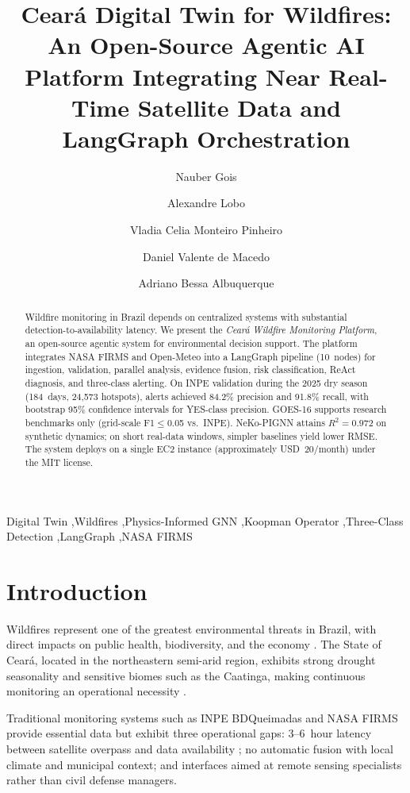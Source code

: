 \documentclass[preprint,12pt,times,numbers]{elsarticle}
\title{Ceará Digital Twin for Wildfires: An Open-Source Agentic AI Platform Integrating Near Real-Time Satellite Data and LangGraph Orchestration}
\author[unifor,cor1]{Nauber Gois\corref{cor1}}
\author[usj]{Alexandre Lobo}
\author[unifor]{Vladia Celia Monteiro Pinheiro}
\author[saxion]{Daniel Valente de Macedo}
\author[unifor2]{Adriano Bessa Albuquerque}
\begin{document}
\begin{frontmatter}

\begin{abstract}
Wildfire monitoring in Brazil depends on centralized systems with substantial detection-to-availability latency. We present the \emph{Ceará Wildfire Monitoring Platform}, an open-source agentic system for environmental decision support. The platform integrates NASA FIRMS and Open-Meteo into a LangGraph pipeline (10~nodes) for ingestion, validation, parallel analysis, evidence fusion, risk classification, ReAct diagnosis, and three-class alerting. On INPE validation during the 2025 dry season (184~days, 24{,}573 hotspots), alerts achieved 84.2\% precision and 91.8\% recall, with bootstrap 95\% confidence intervals for YES-class precision. GOES-16 supports research benchmarks only (grid-scale F1$\leq$0.05 vs.\ INPE). NeKo-PIGNN attains $R^2=0.972$ on synthetic dynamics; on short real-data windows, simpler baselines yield lower RMSE. The system deploys on a single EC2 instance (approximately USD~20/month) under the MIT license.
\end{abstract}

\begin{keyword}
Digital Twin \sep Wildfires \sep Physics-Informed GNN \sep Koopman Operator \sep Three-Class Detection \sep LangGraph \sep NASA FIRMS
\end{keyword}

\end{frontmatter}

\section{Introduction}
\label{sec:intro}

Wildfires represent one of the greatest environmental threats in Brazil, with direct impacts on public health, biodiversity, and the economy \cite{article:alencar2020,master:silva2021}. The State of Ceará, located in the northeastern semi-arid region, exhibits strong drought seasonality and sensitive biomes such as the Caatinga, making continuous monitoring an operational necessity \cite{techreport:funceme2024}.

Traditional monitoring systems such as INPE BDQueimadas and NASA FIRMS provide essential data but exhibit three operational gaps: 3--6~hour latency between satellite overpass and data availability \cite{manual:firms2024}; no automatic fusion with local climate and municipal context; and interfaces aimed at remote sensing specialists rather than civil defense managers.
\end{document}
